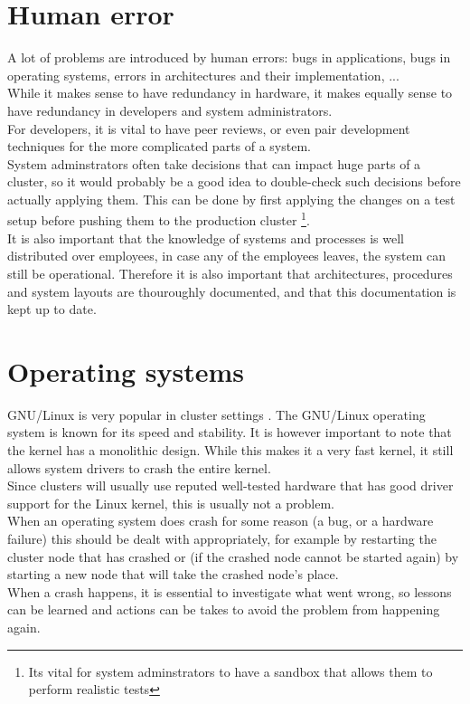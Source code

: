 \documentclass[12pt]{report}
\begin{document}
\section{Human error}
A lot of problems are introduced by human errors: bugs in
applications, bugs in operating systems, errors in architectures and
their implementation, ...\\
While it makes sense to have redundancy in hardware, it makes equally
sense to have redundancy in developers and system administrators.\\
For developers, it is vital to have peer reviews, or even pair
development techniques for the more complicated parts of a system.\\
System adminstrators often take decisions that can impact huge parts
of a cluster, so it would probably be a good idea to double-check such
decisions before actually applying them. This can be done by first
applying the changes on a test setup before pushing them to the
production cluster \footnote{Its vital for system adminstrators to
  have a sandbox that allows them to perform realistic tests}.\\
It is also important that the knowledge of systems and processes is
well distributed over employees, in case any of the employees leaves,
the system can still be operational. Therefore it is also important
that architectures, procedures and system layouts are thouroughly
documented, and that this documentation is kept up to date. 

\section{Operating systems}
GNU/Linux is very popular in cluster settings
\cite{server_market_share}.
The GNU/Linux operating system is known for its speed and stability.
It is however important to note that the kernel has a monolithic
design. While this makes it a very fast kernel, it still allows system drivers
to crash the entire kernel. \\
Since clusters will usually use reputed well-tested hardware that has
good driver support for the Linux kernel, this is usually not  a
problem.\\
When an operating system does crash for some reason (a bug, or a
hardware failure) this should be dealt with appropriately, for example
by restarting the cluster node that has crashed or (if the crashed
node cannot be started again) by starting a new node that will take
the crashed node's place.\\
When a crash happens, it is essential to investigate what went wrong,
so lessons can be learned and actions can be takes to avoid the
problem from happening again.
\end{document}
